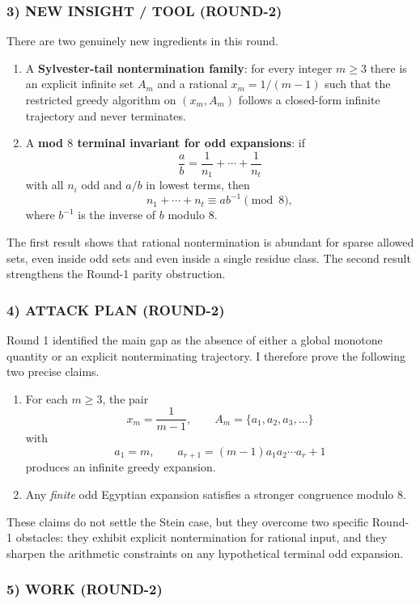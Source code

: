 \subsubsection*{3) NEW INSIGHT / TOOL (ROUND-2)}
There are two genuinely new ingredients in this round.
\begin{enumerate}
\item A \textbf{Sylvester-tail nontermination family}: for every integer $m\ge 3$ there is an explicit infinite set $A_m$ and a rational $x_m=1/(m-1)$ such that the restricted greedy algorithm on $(x_m,A_m)$ follows a closed-form infinite trajectory and never terminates.
\item A \textbf{mod $8$ terminal invariant for odd expansions}: if
\[
\frac{a}{b}=\frac1{n_1}+\cdots+\frac1{n_t}
\]
with all $n_i$ odd and $a/b$ in lowest terms, then
\[
 n_1+\cdots+n_t\equiv a b^{-1}\pmod 8,
\]
where $b^{-1}$ is the inverse of $b$ modulo $8$.
\end{enumerate}
The first result shows that rational nontermination is abundant for sparse allowed sets, even inside odd sets and even inside a single residue class. The second result strengthens the Round-1 parity obstruction.

\subsubsection*{4) ATTACK PLAN (ROUND-2)}
Round 1 identified the main gap as the absence of either a global monotone quantity or an explicit nonterminating trajectory. I therefore prove the following two precise claims.
\begin{enumerate}
\item For each $m\ge 3$, the pair
\[
 x_m=\frac1{m-1},\qquad A_m=\{a_1,a_2,a_3,\dots\}
\]
with
\[
 a_1=m,\qquad a_{r+1}=(m-1)a_1a_2\cdots a_r+1
\]
produces an infinite greedy expansion.
\item Any \emph{finite} odd Egyptian expansion satisfies a stronger congruence modulo $8$.
\end{enumerate}
These claims do not settle the Stein case, but they overcome two specific Round-1 obstacles: they exhibit explicit nontermination for rational input, and they sharpen the arithmetic constraints on any hypothetical terminal odd expansion.

\subsubsection*{5) WORK (ROUND-2)}

